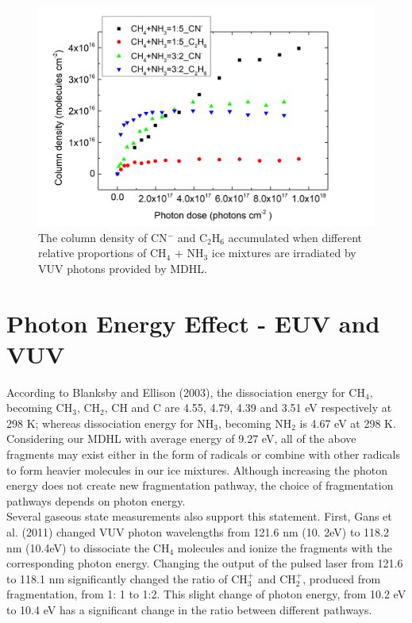 \begin{figure}
\centering
\includegraphics[width=\textwidth]{figures/chapter3/C2H6_CN_comparison.png}
\caption{The column density of CN$^-$ and C$_2$H$_6$ accumulated when different relative proportions of CH$_4$ + NH$_3$ ice mixtures are irradiated by VUV photons provided by MDHL.}
\label{fig:C2H6_CN_comparison}
\end{figure}


\section{Photon Energy Effect - EUV and VUV} %

According to Blanksby and Ellison (2003), the dissociation energy for CH$_4$, becoming CH$_3$, CH$_2$, CH and C are 4.55, 4.79, 4.39 and 3.51 eV respectively at 298 K; whereas dissociation energy for NH$_3$, becoming NH$_2$ is 4.67 eV at 298 K\cite{blanksby2003bond}.\\

Considering our MDHL with average energy of 9.27 eV, all of the above fragments may exist either in the form of radicals or combine with other radicals to form heavier molecules in our ice mixtures. Although increasing the photon energy does not create new fragmentation pathway, the choice of fragmentation pathways depends on photon energy.\\

Several gaseous state measurements also support this statement. First, Gans et al. (2011) \cite{gans2011photolysis} changed VUV photon wavelengths from 121.6 nm (10. 2eV) to 118.2 nm (10.4eV) to dissociate the CH$_4$ molecules and ionize the fragments with the corresponding photon energy. Changing the output of the pulsed laser from 121.6 to 118.1 nm significantly changed the ratio of CH$_3^+$ and CH$_2^+$, produced from fragmentation, from 1: 1 to 1:2. This slight change of photon energy, from 10.2 eV to 10.4 eV has a significant change in the ratio between different pathways.\\

